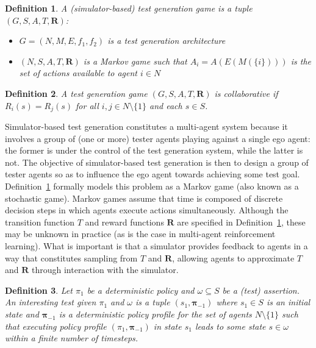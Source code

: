 \documentclass[10pt]{article}
\theoremstyle{plain}
\newtheorem{definition}{Definition}
\newcommand{\vect}[1]{\bm{#1}}
\begin{document}
\begin{definition}\label{definition:game}
    A (simulator-based) test generation game is a tuple $(G, S, A, T, \vect{R})$:
    \begin{itemize}
        \item $G = (N, M, E, f_{1}, f_{2})$ is a test generation architecture
        \item $(N, S, A, T, \vect{R})$ is a Markov game such that $A_{i} = A(E(M(\{ i \})))$ is the set of actions available to agent $i \in N$
    \end{itemize}
\end{definition}

\begin{definition}
    A test generation game $(G, S, A, T, \vect{R})$ is collaborative if $R_{i}(s) = R_{j}(s)$ for all $i, j \in N \setminus \{ 1 \}$ and each $s \in S$.
\end{definition}

Simulator-based test generation constitutes a multi-agent system because it involves a group of (one or more) tester agents playing against a single ego agent: the former is under the control of the test generation system, while the latter is not.
The objective of simulator-based test generation is then to design a group of tester agents so as to influence the ego agent towards achieving some test goal.
Definition~\ref{definition:game} formally models this problem as a Markov game (also known as a stochastic game).
Markov games assume that time is composed of discrete decision steps in which agents execute actions simultaneously.
Although the transition function $T$ and reward functions $\vect{R}$ are specified in Definition~\ref{definition:game}, these may be unknown in practice (as is the case in multi-agent reinforcement learning).
What is important is that a simulator provides feedback to agents in a way that constitutes sampling from $T$ and $\vect{R}$, allowing agents to approximate $T$ and $\vect{R}$ through interaction with the simulator.

\begin{definition}
    Let $\pi_{1}$ be a deterministic policy and $\omega \subseteq S$ be a (test) assertion.
    An interesting test given $\pi_{1}$ and $\omega$ is a tuple $(s_{1}, \vect{\pi}_{-1})$ where $s_{1} \in S$ is an initial state and $\vect{\pi}_{-1}$ is a deterministic policy profile for the set of agents $N \setminus \{ 1 \}$ such that executing policy profile $(\pi_{1}, \vect{\pi}_{-1})$ in state $s_{1}$ leads to some state $s \in \omega$ within a finite number of timesteps.
\end{definition}
\end{document}
